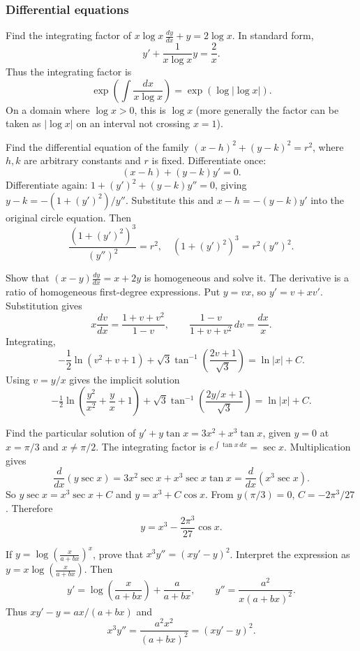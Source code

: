 \subsubsection{Differential equations}
\begin{enumerate}[label={},leftmargin=0pt,itemsep=9pt]
 Find the integrating factor of $x\log x\,\frac{dy}{dx}+y=2\log x$.
\solution In standard form,
\[
y'+\frac{1}{x\log x}y=\frac2x.
\]
Thus the integrating factor is
\[
\exp\!\left(\int\frac{dx}{x\log x}\right)=\exp(\log|\log x|).
\]
On a domain where $\log x>0$, this is $\boxed{\log x}$ (more generally the factor can be taken as $|\log x|$ on an interval not crossing $x=1$).

 Find the differential equation of the family $(x-h)^2+(y-k)^2=r^2$, where $h,k$ are arbitrary constants and $r$ is fixed.
\solution Differentiate once:
\[
(x-h)+(y-k)y'=0.
\]
Differentiate again: $1+(y')^2+(y-k)y''=0$, giving $y-k=-(1+(y')^2)/y''$. Substitute this and $x-h=-(y-k)y'$ into the original circle equation. Then
\[
\frac{(1+(y')^2)^3}{(y'')^2}=r^2,
\quad\boxed{(1+(y')^2)^3=r^2(y'')^2}.
\]

 Show that $(x-y)\frac{dy}{dx}=x+2y$ is homogeneous and solve it.
\solution The derivative is a ratio of homogeneous first-degree expressions. Put $y=vx$, so $y'=v+xv'$. Substitution gives
\[
x\frac{dv}{dx}=\frac{1+v+v^2}{1-v},\qquad
\frac{1-v}{1+v+v^2}\,dv=\frac{dx}{x}.
\]
Integrating,
\[
-\frac12\ln(v^2+v+1)+\sqrt3\tan^{-1}\!\left(\frac{2v+1}{\sqrt3}\right)=\ln|x|+C.
\]
Using $v=y/x$ gives the implicit solution
\[
\boxed{-\tfrac12\ln\!\left(\frac{y^2}{x^2}+\frac yx+1\right)+\sqrt3\tan^{-1}\!\left(\frac{2y/x+1}{\sqrt3}\right)=\ln|x|+C}.
\]

 Find the particular solution of $y'+y\tan x=3x^2+x^3\tan x$, given $y=0$ at $x=\pi/3$ and $x\ne\pi/2$.
\solution The integrating factor is $e^{\int\tan x\,dx}=\sec x$. Multiplication gives
\[
\frac{d}{dx}(y\sec x)=3x^2\sec x+x^3\sec x\tan x=\frac{d}{dx}(x^3\sec x).
\]
So $y\sec x=x^3\sec x+C$ and $y=x^3+C\cos x$. From $y(\pi/3)=0$, $C=-2\pi^3/27$. Therefore
\[
\boxed{y=x^3-\frac{2\pi^3}{27}\cos x}.
\]

 If $y=\log\left(\frac{x}{a+bx}\right)^x$, prove that $x^3y''=(xy'-y)^2$.
\solution Interpret the expression as $y=x\log\left(\frac{x}{a+bx}\right)$. Then
\[
y'=\log\left(\frac{x}{a+bx}\right)+\frac{a}{a+bx},\qquad
 y''=\frac{a^2}{x(a+bx)^2}.
\]
Thus $xy'-y=ax/(a+bx)$ and
\[
x^3y''=\frac{a^2x^2}{(a+bx)^2}=(xy'-y)^2.
\]
\end{enumerate}



